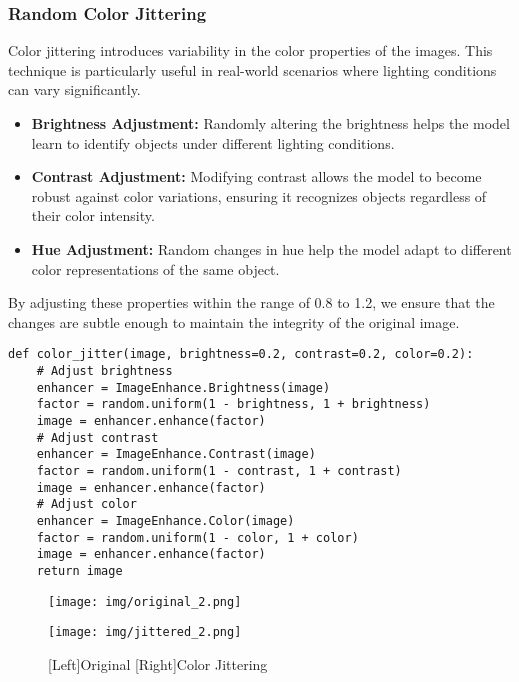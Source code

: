 \documentclass[a4paper,11pt]{article}
\begin{document}
\subsubsection{Random Color Jittering}
Color jittering introduces variability in the color properties of the images. This technique is particularly useful in real-world scenarios where lighting conditions can vary significantly. 
\begin{itemize}
    \item \textbf{Brightness Adjustment:} Randomly altering the brightness helps the model learn to identify objects under different lighting conditions. 
    \item \textbf{Contrast Adjustment:} Modifying contrast allows the model to become robust against color variations, ensuring it recognizes objects regardless of their color intensity.
    \item \textbf{Hue Adjustment:} Random changes in hue help the model adapt to different color representations of the same object.
\end{itemize}
By adjusting these properties within the range of 0.8 to 1.2, we ensure that the changes are subtle enough to maintain the integrity of the original image.

\begin{listing}[!ht]
\begin{verbatim}
def color_jitter(image, brightness=0.2, contrast=0.2, color=0.2):
    # Adjust brightness
    enhancer = ImageEnhance.Brightness(image)
    factor = random.uniform(1 - brightness, 1 + brightness)
    image = enhancer.enhance(factor)
    # Adjust contrast
    enhancer = ImageEnhance.Contrast(image)
    factor = random.uniform(1 - contrast, 1 + contrast)
    image = enhancer.enhance(factor)
    # Adjust color
    enhancer = ImageEnhance.Color(image)
    factor = random.uniform(1 - color, 1 + color)
    image = enhancer.enhance(factor)
    return image
\end{verbatim}
\label{listing:python}
\end{listing}

\begin{figure}[H]
    \centering
    \begin{minipage}{0.49\textwidth}
        \texttt{[image: img/original\_2.png]}
    \end{minipage}
    \hfill
    \begin{minipage}{0.49\textwidth}
        \texttt{[image: img/jittered\_2.png]}
    \end{minipage}
    \caption{[Left]Original [Right]Color Jittering}
\end{figure}
\end{document}
